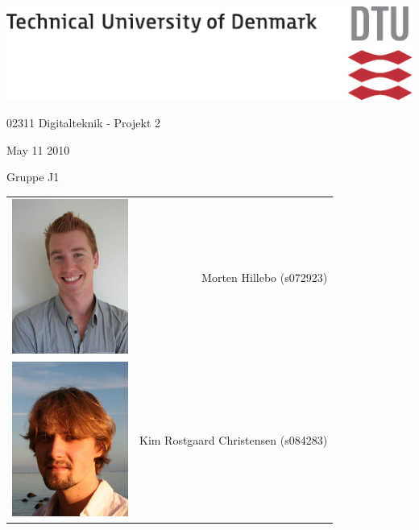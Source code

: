 
\begin{flushright}
{\includegraphics{fig/dtu_A1_UK.pdf}}
\par\end{flushright}

\begin{flushright}
\vspace{2in}

\par\end{flushright}

\begin{center}
{\Huge 02311 Digitalteknik - Projekt 2} 
\par\end{center}



\begin{center}
{\Large May 11 2010} 
\par\end{center}



\begin{center}
Gruppe J1 \\

\par\end{center}

\begin{center}
\begin{tabular}{cr}
 \includegraphics[width=1.5in]{img/MHI.jpg} & Morten Hillebo (s072923) \tabularnewline
 \includegraphics[width=1.5in]{img/KRC.jpg} & Kim Rostgaard Christensen (s084283)\tabularnewline
\end{tabular}
\par\end{center}
\newpage
